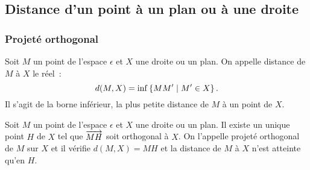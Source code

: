 \subsection{Distance d'un point à un plan ou à une droite}

\subsubsection{Projeté orthogonal}

\begin{defdef}
  Soit \(M\) un point de l'espace \(\epsilon\) et \(X\) une droite ou un
  plan.  On appelle distance de \(M\) à \(X\) le réel~:
  \begin{equation}
    d(M, X) = \operatorname{inf}\left\{MM'\mathrel{}\middle|\mathrel{}M' \in X\right\}.
  \end{equation}
  Il s'agit de la borne inférieur, la plus petite distance de \(M\) à un
  point de \(X\).
\end{defdef}

\begin{prop}
  Soit \(M\) un point de l'espace \(\epsilon\) et \(X\) une droite ou un
  plan.  Il existe un unique point \(H\) de \(X\) tel que \(\overrightarrow{MH}\) soit
  orthogonal à \(X\). On l'appelle projeté orthogonal de \(M\) sur \(X\) et
  il vérifie \(d(M, X) = MH\) et la distance de \(M\) à \(X\) n'est atteinte
  qu'en \(H\).
\end{prop}

